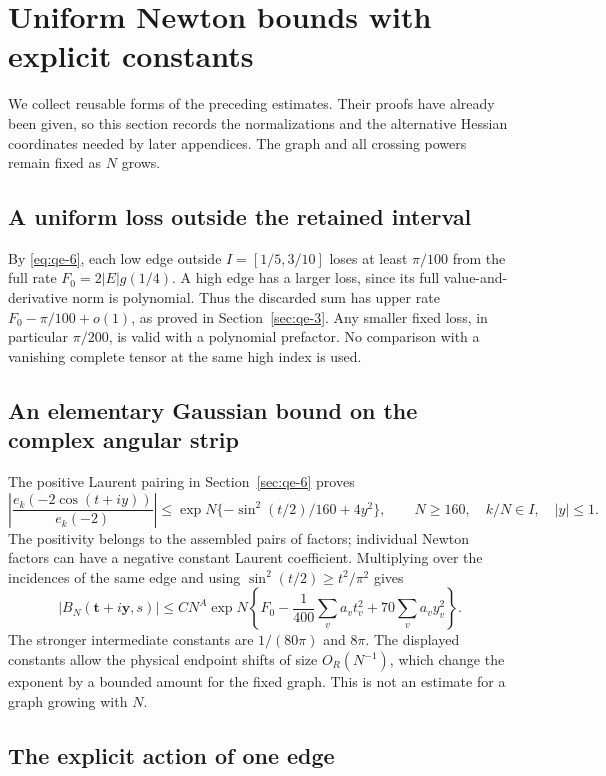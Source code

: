 \section{Uniform Newton bounds with explicit constants}\label{sec:qu}

We collect reusable forms of the preceding estimates. Their proofs
have already been given, so this section records the normalizations
and the alternative Hessian coordinates needed by later appendices.
The graph and all crossing powers remain fixed as $N$ grows.

\subsection{A uniform loss outside the retained interval}\label{sec:qu-1}

By \eqref{eq:qe-6}, each low edge outside $I=[1/5,3/10]$
loses at least $\pi/100$ from the full rate
$F_0=2|E|g(1/4)$. A high edge has a larger loss, since its full
value-and-derivative norm is polynomial. Thus the discarded sum has
upper rate $F_0-\pi/100+o(1)$, as proved in
Section~\ref{sec:qe-3}. Any smaller fixed loss, in particular
$\pi/200$, is valid with a polynomial prefactor. No comparison
with a vanishing complete tensor at the same high index is used.

\subsection{An elementary Gaussian bound on the complex angular strip}\label{sec:qu-2}

The positive Laurent pairing in Section~\ref{sec:qe-6} proves
\[
\left|\frac{e_k(-2\cos(t+iy))}{e_k(-2)}\right|
\le\exp N\{-\sin^2(t/2)/160+4y^2\},
\qquad N\ge160,\quad k/N\in I,\quad |y|\le1.
\]
The positivity belongs to the assembled pairs of factors; individual
Newton factors can have a negative constant Laurent coefficient.
Multiplying over the incidences of the same edge and using
$\sin^2(t/2)\ge t^2/\pi^2$ gives
\[
|B_N(\mathbf t+i\mathbf y,s)|
\le C N^A\exp N\left\{
F_0-\frac1{400}\sum_v a_vt_v^2
       +70\sum_v a_vy_v^2\right\}.
\]
The stronger intermediate constants are $1/(80\pi)$ and $8\pi$.
The displayed constants allow the physical endpoint shifts of
size $O_R(N^{-1})$, which change the exponent by a bounded
amount for the fixed graph. This is not an estimate for a graph
growing with $N$.

\subsection{The explicit action of one edge}\label{sec:qu-3}

